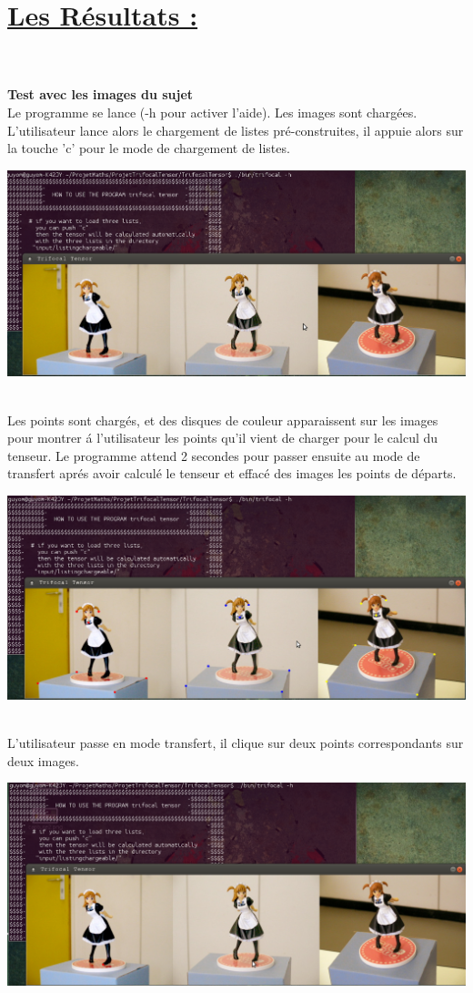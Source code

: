 \documentclass[a4paper,11pt,fleqn]{report}
\begin{document}
	\section{\underline{Les R\'esultats :}}
	\\\\
	\textbf{Test avec les images du sujet}\\
	Le programme se lance (-h pour activer l'aide). Les images sont charg\'ees. L'utilisateur lance alors le chargement de listes pr\'e-construites, il appuie alors sur la touche 'c' pour le mode de chargement de listes.
	\begin{center}\includegraphics[scale=0.50]{./capture1.png}\end{center}\\
	Les points sont charg\'es, et des disques de couleur apparaissent sur les images pour montrer \'a l'utilisateur les points qu'il vient de charger pour le calcul du tenseur. Le programme attend 2 secondes pour passer ensuite au mode de transfert apr\'es avoir calcul\'e le tenseur et effac\'e des images les points de d\'eparts.
	\begin{center}\includegraphics[scale=0.50]{./capture2.png}\end{center}\\
	L'utilisateur passe en mode transfert, il clique sur deux points correspondants sur deux images.
	\begin{center}\includegraphics[scale=0.50]{./capture3.png}\end{center}\\
\end{document}
